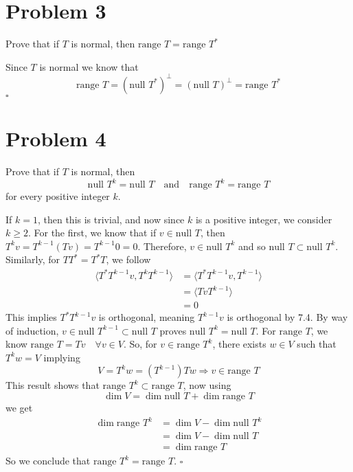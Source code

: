 \documentclass[12pt]{article}
\newenvironment{proof}{\noindent{\bf Proof.}}{\hfill $\square$\medskip}
\begin{document}
\section{Problem 3}
Prove that if $T$ is normal, then $\text{range }T=\text{range }T^{*}$

\begin{proof}
Since $T$ is normal we know that
$$\text{range }T=(\text{null }T^{*})^{\perp}=(\text{null }T)^{\perp}=\text{range }T^{*}$$
\end{proof}


\section{Problem 4}
Prove that if $T$ is normal, then
$$\text{null }T^{k}=\text{null }T\quad \text{and}\quad \text{range }T^{k}=\text{range }T$$
for every positive integer $k$.

\begin{proof}
If $k=1$, then this is trivial, and now since $k$ is a positive integer, we consider $k\geq 2$. For the first, we know that if $v\in\text{null }T$, then $T^{k}v=T^{k-1}(Tv)=T^{k-1}0=0$.
Therefore, $v\in\text{null }T^{k}$ and so $\text{null }T\subset\text{null }T^{k}$. Similarly, for $TT^{*}=T^{*}T$, we follow
\begin{equation}
\begin{split}
\langle T^{*}T^{k-1}v,T^{k}T^{k-1}\rangle&=\langle T^{*}T^{k-1}v,T^{k-1}\rangle\\
&=\langle TvT^{k-1}\rangle\\
&=0
\end{split}
\end{equation}
This implies $T^{*}T^{k-1}v$ is orthogonal, meaning $T^{k-1}v$ is orthogonal by 7.4. By way of induction, $v\in \text{null }T^{k-1}\subset\text{null }T$ proves $\text{null }T^{k}=\text{null }T$.
For $\text{range }T$, we know $\text{range }T=Tv\quad\forall v\in V$. So, for $v\in\text{range }T^{k}$, there exists $w\in V$ such that $T^{k}w=V$ implying
$$V=T^{k}w=(T^{k-1})Tw\Rightarrow v\in\text{range }T$$
This result shows that $\text{range }T^{k}\subset\text{range }T$, now using
$$\dim V=\dim\text{null } T+\dim\text{range } T$$
we get
\begin{equation}
\begin{split}
\dim\text{range }T^{k}&=\dim V-\dim\text{null }T^{k}\\
&=\dim V-\dim\text{null }T\\
&=\dim\text{range }T
\end{split}
\end{equation}
So we conclude that $\text{range }T^{k}=\text{range }T$.
\end{proof}
\end{document}
